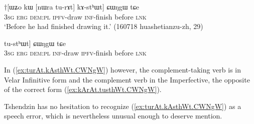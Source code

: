 \begin{exe}
\ex \label{ex:turAt.kAsthWt.CWNgW}
\gll $\dagger$[ɯʑo kɯ [nɯra tu-rɤt] kɤ-stʰɯt] ɕɯŋgɯ tɕe \\
\textsc{3sg} \textsc{erg} \textsc{dem}:\textsc{pl} \textsc{ipfv}-draw \textsc{inf}-finish before \textsc{lnk} \\
\glt `Before he had finished drawing it.' (160718 huashetianzu-zh, 29)
\end{exe} 

\begin{exe}
\ex \label{ex:kArAt.tusthWt.CWNgW}
\gll [ɯʑo kɯ [nɯra kɤ-rɤt] tu-stʰɯt] ɕɯŋgɯ tɕe \\
\textsc{3sg} \textsc{erg} \textsc{dem}:\textsc{pl} \textsc{inf}-draw \textsc{ipfv}-finish before \textsc{lnk} \\
\end{exe}   

In (\ref{ex:turAt.kAsthWt.CWNgW}) however, the complement-taking verb is in Velar Infinitive form and the complement verb in the Imperfective, the opposite of the correct form (\ref{ex:kArAt.tusthWt.CWNgW}).

Tshendzin has no hesitation to recognize (\ref{ex:turAt.kAsthWt.CWNgW}) as a speech error, which is nevertheless unusual enough to deserve mention.

